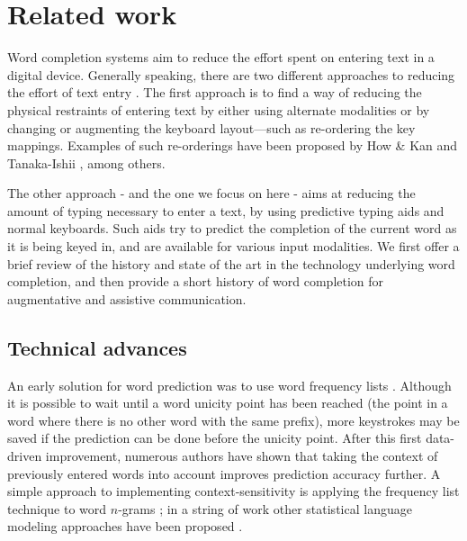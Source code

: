 \documentclass[12pt]{article}
\begin{document}
\section{Related work}
\label{related}

Word completion systems aim to reduce the effort spent on entering text in a digital device. Generally speaking, there are two different approaches to reducing the effort of text entry \cite{Stocky+04}. The first approach is to find a way of reducing the physical restraints of entering text by either using alternate modalities or by changing or augmenting the keyboard layout---such as re-ordering the key mappings. Examples of such re-orderings have been proposed by How \& Kan \citeyear{How+05} and Tanaka-Ishii \citeyear{Tanaka-Ishii07}, among others.

The other approach - and the one we focus on here - aims at reducing the amount of typing necessary to enter a text, by using predictive typing aids and normal keyboards. Such aids try to predict the completion of the current word as it is being keyed in, and are available for various input modalities. We first offer a brief review of the history and state of the art in the technology underlying word completion, and then provide a short history of word completion for augmentative and assistive communication.

\subsection{Technical advances}

An early solution for word prediction was to use word frequency lists \cite{Swiffin+85}. Although it is possible to wait until a word unicity point has been reached (the point in a word where there is no other word with the same prefix), more keystrokes may be saved if the prediction can be done before the unicity point. After this first data-driven improvement, numerous authors have shown that taking the context of previously entered words into account improves prediction accuracy further. A simple approach to implementing context-sensitivity is applying the frequency list technique to word $n$-grams \cite{hunnicutt87}; in a string of work other statistical language modeling approaches have been proposed \cite{Lesher+99,Langlais+00,Garay-Vitoria+06,Tanaka-Ishii07,vandenbosch+08}. 
\end{document}
